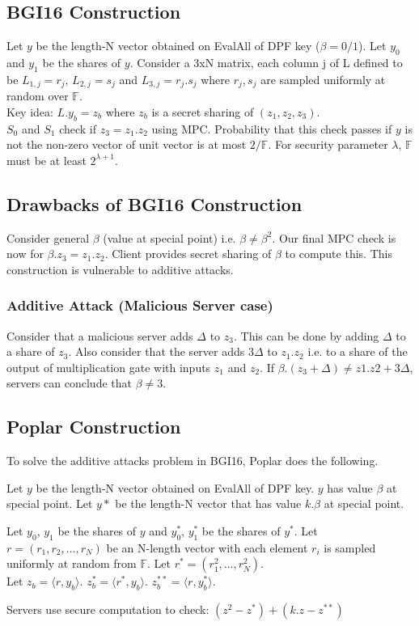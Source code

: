 \subsection{BGI16 Construction}
Let $y$ be the length-N vector obtained on EvalAll of DPF key ($\beta=0/1$). Let $y_0$ and $y_1$ be the shares of $y$. Consider a 3xN matrix, each column j of L defined to be $L_{1, j} = r_j$, $L_{2, j} = s_j$ and $L_{3, j} = r_j.s_j$ where $r_j, s_j$ are sampled uniformly at random over $\mathbb{F}$. \\

Key idea: $L.y_b = z_b$ where $z_b$ is a secret sharing of $(z_1, z_2, z_3)$. \\

$S_0$ and $S_1$ check if $z_3 = z_1.z_2$ using MPC. Probability that this check passes if $y$ is not the non-zero vector of unit vector is at most $2/\mathbb{F}$. For security parameter $\lambda$, $\mathbb{F}$ must be at least $2^{\lambda+1}$.

\subsection{Drawbacks of BGI16 Construction}
Consider general $\beta$ (value at special point) i.e. $\beta \neq \beta^2$. Our final MPC check is now for $\beta.z_3 = z_1.z_2$. Client provides secret sharing of $\beta$ to compute this. This construction is vulnerable to additive attacks.

\subsubsection{Additive Attack (Malicious Server case)}
Consider that a malicious server adds $\Delta$ to $z_3$. This can be done by adding $\Delta$ to a share of $z_3$. Also consider that the server adds $3\Delta$ to $z_1.z_2$ i.e. to a share of the output of multiplication gate with inputs $z_1$ and $z_2$. If $\beta.(z_3+\Delta) \neq z1.z2 + 3\Delta$, servers can conclude that $\beta \neq 3$. 

\subsection{Poplar Construction}
To solve the additive attacks problem in BGI16, Poplar does the following.

Let $y$ be the length-N vector obtained on EvalAll of DPF key. $y$ has value $\beta$ at special point. Let $y*$ be the length-N vector that has value $k.\beta$ at special point.

Let $y_0$, $y_1$ be the shares of $y$ and $y^*_0$, $y^*_1$ be the shares of $y^*$. Let $r = (r_1, r_2, ..., r_N)$ be an N-length vector with each element $r_i$ is sampled uniformly at random from $\mathbb{F}$. Let $r^* = (r_1^2, ..., r_N^2)$. \\

Let $z_b = \langle r, y_b \rangle$. $z_b^* = \langle r^*, y_b \rangle$. $z_b^{**} = \langle r, y_b^* \rangle$.

Servers use secure computation to check: $(z^2 - z^*) + (k.z - z^{**})$
%
